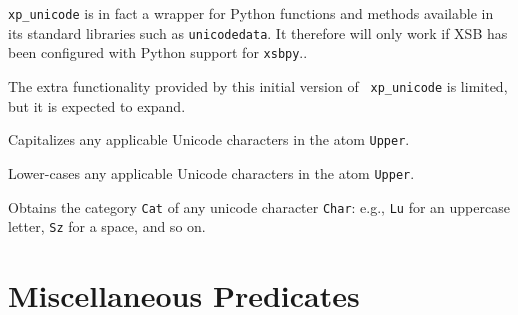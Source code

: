 {\tt xp\_unicode} is in fact a wrapper for Python functions and
methods available in its standard libraries such as {\tt unicodedata}.
It therefore will only work if XSB has been configured with Python
support for {\tt xsbpy}..

The extra functionality provided by this initial version of {\tt
  xp\_unicode} is limited, but it is expected to expand.

\begin{description}

  Capitalizes any applicable Unicode characters in the atom {\tt Upper}.

  Lower-cases any applicable Unicode characters in the atom {\tt Upper}.

Obtains the category {\tt Cat} of any unicode character {\tt Char}:
e.g., {\tt Lu} for an uppercase letter, {\tt Sz} for a space, and so on.

\end{description}

\section{Miscellaneous Predicates}

